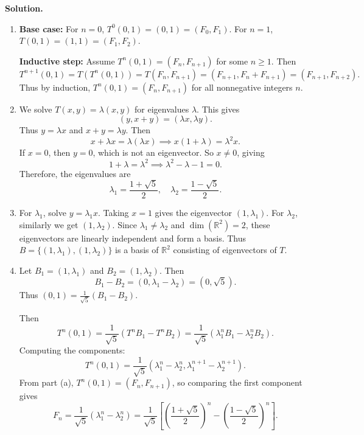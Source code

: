 \documentclass[11pt]{article}
\newcommand{\SolutionAnnounce}{\noindent\textbf{Solution.}\par\medskip}
\newcommand{\R}{\mathbb{R}}
\begin{document}
\begin{solutionBox}
\SolutionAnnounce
\doublespacing

\begin{enumerate}
    \item[(a)] 
    \textbf{Base case:} For \(n = 0\), \(T^0(0,1) = (0,1) = (F_0, F_1)\). 
    For \(n = 1\), \(T(0,1) = (1,1) = (F_1, F_2)\).
    
    \textbf{Inductive step:} Assume \(T^n(0,1) = (F_n, F_{n+1})\) for some \(n \geq 1\). Then
    \[
    T^{n+1}(0,1) = T(T^n(0,1)) = T(F_n, F_{n+1}) = (F_{n+1}, F_n + F_{n+1}) = (F_{n+1}, F_{n+2}).
    \]
    Thus by induction, \(T^n(0,1) = (F_n, F_{n+1})\) for all nonnegative integers \(n\).
    
    \item[(b)] 
    We solve \(T(x,y) = \lambda(x,y)\) for eigenvalues \(\lambda\). This gives
    \[(y, x+y) = (\lambda x, \lambda y).\]
    Thus \(y = \lambda x\) and \(x + y = \lambda y\). Then
    \[x + \lambda x = \lambda(\lambda x) \implies x(1 + \lambda) = \lambda^2 x.\]
    If \(x = 0\), then \(y = 0\), which is not an eigenvector. So \(x \neq 0\), giving
    \[1 + \lambda = \lambda^2 \implies \lambda^2 - \lambda - 1 = 0.\]
    Therefore, the eigenvalues are
    \[\lambda_1 = \frac{1 + \sqrt{5}}{2}, \quad \lambda_2 = \frac{1 - \sqrt{5}}{2}.\]
    
    \item[(c)] 
    For \(\lambda_1\), solve \(y = \lambda_1 x\). Taking \(x = 1\) gives the eigenvector \((1, \lambda_1)\). 
    For \(\lambda_2\), similarly we get \((1, \lambda_2)\). 
    Since \(\lambda_1 \neq \lambda_2\) and \(\dim(\R^2) = 2\), these eigenvectors are linearly independent and form a basis. 
    Thus \(B = \{(1, \lambda_1), (1, \lambda_2)\}\) is a basis of \(\R^2\) consisting of eigenvectors of \(T\).
    
    \item[(d)] 
    Let \(B_1 = (1, \lambda_1)\) and \(B_2 = (1, \lambda_2)\). Then
    \[B_1 - B_2 = (0, \lambda_1 - \lambda_2) = (0, \sqrt{5}).\]
    Thus \((0,1) = \frac{1}{\sqrt{5}}(B_1 - B_2)\).
    
    Then
    \[
    T^n(0,1) = \frac{1}{\sqrt{5}}(T^n B_1 - T^n B_2) = \frac{1}{\sqrt{5}}(\lambda_1^n B_1 - \lambda_2^n B_2).
    \]
    Computing the components:
    \[
    T^n(0,1) = \frac{1}{\sqrt{5}}\left(\lambda_1^n - \lambda_2^n, \lambda_1^{n+1} - \lambda_2^{n+1}\right).
    \]
    From part (a), \(T^n(0,1) = (F_n, F_{n+1})\), so comparing the first component gives
    \[F_n = \frac{1}{\sqrt{5}}\left(\lambda_1^n - \lambda_2^n\right) = \frac{1}{\sqrt{5}}\left[\left(\frac{1 + \sqrt{5}}{2}\right)^{n} - \left(\frac{1 - \sqrt{5}}{2}\right)^{n}\right].\]
    

\end{enumerate}
\end{solutionBox}
\end{document}
